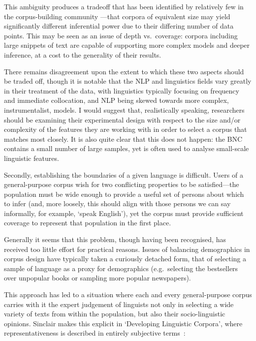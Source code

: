 This ambiguity produces a tradeoff that has been identified by relatively few in the corpus-building community\cite{evert2006random,kilgarriff2005language,gries2011corpus}%
---that corpora of equivalent size may yield significantly different inferential power due to their differing number of data points.  This may be seen as an issue of depth vs.\ coverage: corpora including large snippets of text are capable of supporting more complex models and deeper inference, at a cost to the generality of their results.

There remains disagreement upon the extent to which these two aspects should be traded off, though it is notable that the NLP and linguistics fields vary greatly in their treatment of the data, with linguistics typically focusing on frequency and immediate collocation, and NLP being skewed towards more complex, instrumentalist, models.  %
I would suggest that, realistically speaking, researchers should be examining their experimental design with respect to the size and/or complexity of the features they are working with in order to select a corpus that matches most closely.  It is also quite clear that this does not happen: the BNC contains a small number of large samples, yet is often used to analyse small-scale linguistic features.


Secondly, establishing the boundaries of a given language is difficult.  Users of a general-purpose corpus wish for two conflicting properties to be satisfied---the population must be wide enough to provide a useful set of persons about which to infer (and, more loosely, this should align with those persons we can say informally, for example, `speak English'), yet the corpus must provide sufficient coverage to represent that population in the first place.

Generally it seems that this problem, though having been recognised, has received too little effort for practical reasons.  Issues of balancing demographics in corpus design have typically taken a curiously detached form, that of selecting a sample of language as a proxy for demographics (e.g.\ selecting the bestsellers over unpopular books or sampling more popular newspapers).


This approach has led to a situation where each and every general-purpose corpus carries with it the expert judgement of linguists not only in selecting a wide variety of texts from within the population, but also their socio-linguistic opinions.  Sinclair makes this explicit in `Developing Linguistic Corpora', where representativeness is described in entirely subjective terms~\cite[p.5]{wynne2005developing}:

